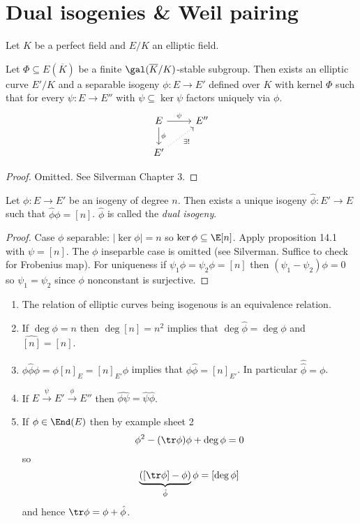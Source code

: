 \documentclass[a4paper]{article}
\theoremstyle{definition}
\begin{document}
\section{Dual isogenies \& Weil pairing}

Let \(K\) be a perfect field and \(E/K\) an elliptic field.

\begin{proposition}
  Let \(\Phi \subseteq E(\overline K)\) be a finite \(\gal(\overline K/K)\)-stable subgroup. Then exists an elliptic curve \(E'/K\) and a separable isogeny \(\phi: E \to E'\) defined over \(K\) with kernel \(\Phi\) such that for every \(\psi: E \to E''\) with \(\psi \subseteq \ker \psi\) factors uniquely via \(\phi\).
  \[
    \begin{tikzcd}
      E \ar[d, "\phi"] \ar[r, "\psi"] & E'' \\
      E' \ar[ur, dotted, "\exists !"']
    \end{tikzcd}
  \]
\end{proposition}

\begin{proof}
  Omitted. See Silverman Chapter 3.
\end{proof}

\begin{proposition}
  Let \(\phi: E \to E'\) be an isogeny of degree \(n\). Then exists a unique isogeny \(\hat \phi: E' \to E\) such that \(\hat \phi \phi = [n]\). \(\hat \phi\) is called the \emph{dual isogeny}.
\end{proposition}

\begin{proof}
  Case \(\phi\) separable: \(|\ker \phi| = n\) so \(\ker \phi \subseteq \E[n]\). Apply proposition 14.1 with \(\psi = [n]\). The \(\phi\) inseparble case is omitted (see Silverman. Suffice to check for Frobenius map). For uniqueness if \(\psi_1 \phi = \psi_2 \phi = [n]\) then \((\psi_1 - \psi_2) \phi = 0\) so \(\psi_1 = \psi_2\) since \(\phi\) nonconstant is surjective.
\end{proof}

\begin{remark}\leavevmode
  \begin{enumerate}
  \item The relation of elliptic curves being isogenous is an equivalence relation.
  \item If \(\deg \phi = n\) then \(\deg [n] = n^2\) implies that \(\deg \hat \phi = \deg \phi\) and \(\widehat{[n]} = [n]\).
  \item \(\phi \hat \phi \phi = \phi [n]_E = [n]_{E'} \phi\) implies that \(\phi \hat \phi = [n]_{E'}\). In particular \(\hat{\hat \phi} = \phi\).
  \item If \(E \xrightarrow{\psi} E' \xrightarrow{\phi} E''\) then \(\widehat{\phi\psi} = \hat \psi \hat \phi\).
  \item If \(\phi \in \End(E)\) then by example sheet 2
    \[
      \phi^2 - (\tr \phi) \phi + \deg \phi = 0
    \]
    so
    \[
      \underbrace{([\tr \phi] - \phi)}_{\hat \phi} \phi = [\deg \phi]
    \]
    and hence \(\tr \phi = \phi + \hat \phi\).
  \end{enumerate}
\end{remark}
\end{document}
